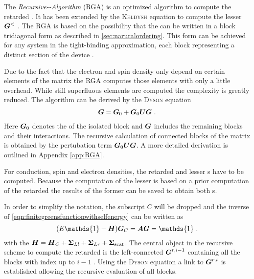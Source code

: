 \label{sec:rgapresentation}
The \emph{Recursive-\gfnc-Algorithm} (RGA) \cite{MacKinnon1985} is an optimized algorithm to compute the retarded \gfnc{}. It has been extended by the \textsc{Keldysh} equation to compute the lesser \gfnc{} $\boldsymbol{G}^<$ \cite{JApplPhys.91.2343}.
The RGA is based on the possibility that the \hamil{} can be written in a block tridiagonal form as described in \cref{sec:naruralordering}.
This form can be achieved for any system in the tight-binding approximation, each block representing a distinct section of the device \cite{Wimmer2009Thesis}.\par
Due to the fact that the electron and spin density only depend on certain elements of the \gfnc{} matrix the RGA computes those elements with only a little overhead. While still superfluous elements are computed the complexity is greatly reduced. The algorithm can be derived by the \textsc{Dyson} equation
\begin{align}
	\boldsymbol{G} = \boldsymbol{G}_0+\boldsymbol{G}_0\boldsymbol{U}\boldsymbol{G}\ .
	\label{eqn:DysonEquationG}
\end{align}
Here $\boldsymbol{G}_0$ denotes the \gfnc{} of the isolated block and $\boldsymbol{G}$ includes the remaining blocks and their interactions. The recursive calculation of connected blocks of the \gfnc{} matrix is obtained by the pertubation term $\boldsymbol{G}_0\boldsymbol{U}\boldsymbol{G}$. A more detailed derivation is outlined in Appendix \ref{app:RGA}.\par
For conduction, spin and electron densities, the retarded and lesser \gfnc s have to be computed. Because the computation of the lesser \gfnc{} is based on a prior computation of the retarded \gfnc{} the results of the former can be saved to obtain both \gfnc s.\par
In order to simplify the notation, the subscript $C$ will be dropped and the inverse of \cref{eqn:finitegreensfunctionwithselfenergy} can be written as
\begin{align}
(E\mathds{1}-\mat{H})\mat{G}_C = \mat{A}\mat{G}=\mathds{1}\ .
\label{eqn:amatrix}
\end{align}
with the \hamil{} $\boldsymbol{H}=\boldsymbol{H}_C +\boldsymbol{\Sigma}_{Ll}+\boldsymbol{\Sigma}_{Lr}+\boldsymbol{\Sigma}_{\text{scat}} $.
The central object in the recursive scheme to compute the retarded \gfnc{} is the left-connected \gfnc{} $\boldsymbol{G}^{r,i-1}$ containing all the blocks with index up to $i-1$ \cite{JApplPhys.91.2343}. Using the \textsc{Dyson} equation a link to $\boldsymbol{G}^{r,i}$ is established allowing the recursive evaluation of all blocks.\par
